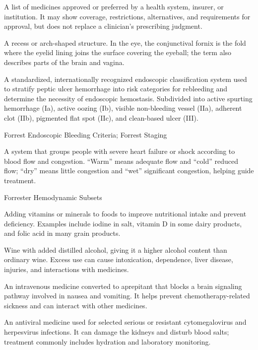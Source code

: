  A list of medicines approved or preferred by a health system, insurer, or institution. It may show coverage, restrictions, alternatives, and requirements for approval, but does not replace a clinician’s prescribing judgment.

 A recess or arch-shaped structure. In the eye, the conjunctival fornix is the fold where the eyelid lining joins the surface covering the eyeball; the term also describes parts of the brain and vagina.

 A standardized, internationally recognized endoscopic classification system used to stratify peptic ulcer hemorrhage into risk categories for rebleeding and determine the necessity of endoscopic hemostasis. Subdivided into active spurting hemorrhage (Ia), active oozing (Ib), visible non-bleeding vessel (IIa), adherent clot (IIb), pigmented flat spot (IIc), and clean-based ulcer (III).

\synonyms
Forrest Endoscopic Bleeding Criteria; Forrest Staging

 A system that groups people with severe heart failure or shock according to blood flow and congestion. “Warm” means adequate flow and “cold” reduced flow; “dry” means little congestion and “wet” significant congestion, helping guide treatment.

\synonyms
Forrester Hemodynamic Subsets

 Adding vitamins or minerals to foods to improve nutritional intake and prevent deficiency. Examples include iodine in salt, vitamin D in some dairy products, and folic acid in many grain products.

 Wine with added distilled alcohol, giving it a higher alcohol content than ordinary wine. Excess use can cause intoxication, dependence, liver disease, injuries, and interactions with medicines.

 An intravenous medicine converted to aprepitant that blocks a brain signaling pathway involved in nausea and vomiting. It helps prevent chemotherapy-related sickness and can interact with other medicines.

 An antiviral medicine used for selected serious or resistant cytomegalovirus and herpesvirus infections. It can damage the kidneys and disturb blood salts; treatment commonly includes hydration and laboratory monitoring.


